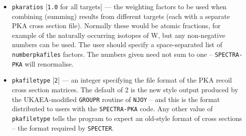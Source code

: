 \documentclass[a4paper]{article}
\begin{document}
\begin{itemize}
\item \texttt{pka{\textunderscore}ratios} [\texttt{1.0} for all targets] --- the weighting factors to be used when combining (summing) results from different targets (each with a separate PKA cross section file). Normally these would be atomic fractions, for example of the naturally occurring isotopes of W, but any non-negative numbers can be used. The user should specify a space-separated list of \texttt{number{\textunderscore}pka{\textunderscore}files} factors. The numbers given need not sum to one -- \texttt{SPECTRA-PKA} will renormalise.


\item \texttt{pka{\textunderscore}filetype} [\texttt{2}] --- an integer specifying the file format of the PKA recoil cross section matrices. The default of 2 is the new style output produced by the UKAEA-modified \texttt{GROUPR} routine of \texttt{NJOY} -- and this is the format distributed to users with the \texttt{SPECTRA-PKA} code. Any other value of \texttt{pka{\textunderscore}filetype} tells the program to expect an old-style format of cross sections -- the format required by \texttt{SPECTER}.



\end{itemize}
\end{document}
